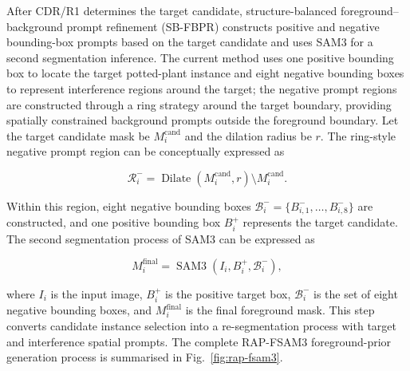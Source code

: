 \documentclass[a4paper]{cas-sc}
\begin{document}
After CDR/R1 determines the target candidate, structure-balanced foreground--background prompt refinement (SB-FBPR) constructs positive and negative bounding-box prompts based on the target candidate and uses SAM3 for a second segmentation inference. The current method uses one positive bounding box to locate the target potted-plant instance and eight negative bounding boxes to represent interference regions around the target; the negative prompt regions are constructed through a ring strategy around the target boundary, providing spatially constrained background prompts outside the foreground boundary. Let the target candidate mask be \(M_i^{\mathrm{cand}}\) and the dilation radius be \(r\). The ring-style negative prompt region can be conceptually expressed as

\[
\mathcal{R}_i^{-}=\operatorname{Dilate}(M_i^{\mathrm{cand}},r)\setminus M_i^{\mathrm{cand}}.
\]

Within this region, eight negative bounding boxes \(\mathcal{B}_i^{-}=\{B_{i,1}^{-},\ldots,B_{i,8}^{-}\}\) are constructed, and one positive bounding box \(B_i^{+}\) represents the target candidate. The second segmentation process of SAM3 can be expressed as

\[
M_i^{\mathrm{final}}=\operatorname{SAM3}\!\left(I_i,B_i^{+},\mathcal{B}_i^{-}\right),
\]

where \(I_i\) is the input image, \(B_i^{+}\) is the positive target box, \(\mathcal{B}_i^{-}\) is the set of eight negative bounding boxes, and \(M_i^{\mathrm{final}}\) is the final foreground mask. This step converts candidate instance selection into a re-segmentation process with target and interference spatial prompts. The complete RAP-FSAM3 foreground-prior generation process is summarised in Fig.~\ref{fig:rap-fsam3}.
\end{document}

